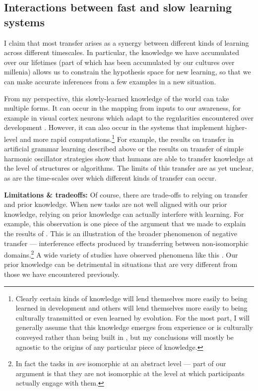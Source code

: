 \subsection{Interactions between fast and slow learning systems} \label{fast_slow_interactions}
I claim that most transfer arises as a synergy between different kinds of learning across different timescales. In particular, the knowledge we have accumulated over our lifetimes (part of which has been accumulated by our cultures over millenia) allows us to constrain the hypothesis space for new learning, so that we can make accurate inferences from a few examples in a new situation. \par 
From my perspective, this slowly-learned knowledge of the world can take multiple forms. It can occur in the mapping from inputs to our awareness, for example in visual cortex neurons which adapt to the regularities encountered over development \citep{Barlow1975}. However, it can also occur in the systems that implement higher-level and more rapid computations.\footnote{Clearly certain kinds of knowledge will lend themselves more easily to being learned in development and others will lend themselves more easily to being culturally transmitted or even learned by evolution. For the most part, I will generally assume that this knowledge emerges from experience or is culturally conveyed rather than being built in \citep{Hansen2017}, but my conclusions will mostly be agnostic to the origins of any particular piece of knowledge.} For example, the results on transfer in artificial grammar learning described above \citep{Tunney2001} or the results on transfer of simple harmonic oscillator strategies \citep{Day2011} show that humans are able to transfer knowledge at the level of structures or algorithms. The limits of this transfer are as yet unclear, as are the time-scales over which different kinds of transfer can occur.\par  
\textbf{Limitations \& tradeoffs:} Of course, there are trade-offs to relying on transfer and prior knowledge. When new tasks are not well aligned with our prior knowledge, relying on prior knowledge can actually interfere with learning. For example, this observation is one piece of the argument that we made \citep{Lampinen2017b} to explain the results of \citet{Kaminski2008}. This is an illustration of the broader phenomenon of negative transfer --- interference effects produced by transferring between non-isomorphic domains.\footnote{In fact the tasks in \citet{Kaminski2008} \emph{are} isomorphic at an abstract level --- part of our argument is that they are not isomorphic at the level at which participants actually engage with them.} A wide variety of studies have observed phenomena like this \citep[e.g.][]{Luchins1942, Landrum2005}. Our prior knowledge can be detrimental in situations that are very different from those we have encountered previously. \par
